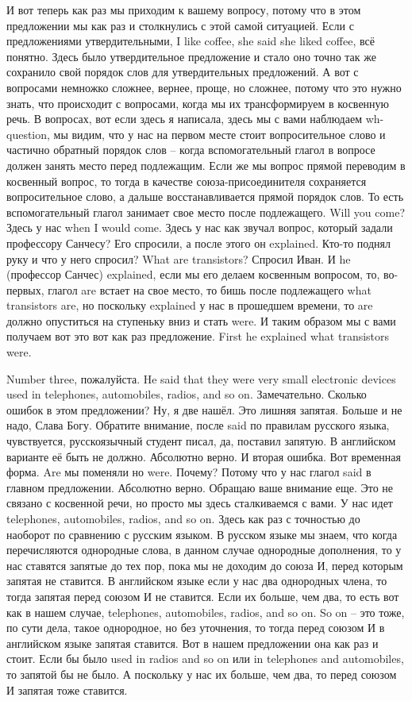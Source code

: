\documentclass[main.tex]{subfiles}
\begin{document}
И вот теперь как раз мы приходим к вашему вопросу, потому что в этом предложении мы как раз и столкнулись с этой самой ситуацией.
Если с предложениями утвердительными, I like coffee, she said she liked coffee, всё понятно.
Здесь было утвердительное предложение и стало оно точно так же сохранило свой порядок слов для утвердительных предложений.
А вот с вопросами немножко сложнее, вернее, проще, но сложнее, потому что это нужно знать, что происходит с вопросами, когда мы их трансформируем в косвенную речь.
В вопросах, вот если здесь я написала, здесь мы с вами наблюдаем wh-question, мы видим, что у нас на первом месте стоит вопросительное слово и частично обратный порядок слов -- когда вспомогательный глагол в вопросе должен занять место перед подлежащим.
Если же мы вопрос прямой переводим в косвенный вопрос, то тогда в качестве союза-присоединителя сохраняется вопросительное слово, а дальше восстанавливается прямой порядок слов.
То есть вспомогательный глагол занимает свое место после подлежащего.
Will you come?
Здесь у нас when I would come.
Здесь у нас как звучал вопрос, который задали профессору Санчесу?
Его спросили, а после этого он explained.
Кто-то поднял руку и что у него спросил?
What are transistors?
Спросил Иван.
И he (профессор Санчес) explained, если мы его делаем косвенным вопросом, то, во-первых, глагол are встает на свое место, то бишь после подлежащего what transistors are, но поскольку explained у нас в прошедшем времени, то are должно опуститься на ступеньку вниз и стать were.
И таким образом мы с вами получаем вот это вот как раз предложение.
First he explained what transistors were.

Number three, пожалуйста.
He said that they were very small electronic devices used in telephones, automobiles, radios, and so on.
Замечательно.
Сколько ошибок в этом предложении?
Ну, я две нашёл.
Это лишняя запятая.
Больше и не надо, Слава Богу.
Обратите внимание, после said по правилам русского языка, чувствуется, русскоязычный студент писал, да, поставил запятую.
В английском варианте её быть не должно.
Абсолютно верно.
И вторая ошибка.
Вот временная форма.
Are мы поменяли но were.
Почему?
Потому что у нас глагол said в главном предложении.
Абсолютно верно.
Обращаю ваше внимание еще.
Это не связано с косвенной речи, но просто мы здесь сталкиваемся с вами.
У нас идет telephones, automobiles, radios, and so on.
Здесь как раз с точностью до наоборот по сравнению с русским языком.
В русском языке мы знаем, что когда перечисляются однородные слова, в данном случае однородные дополнения, то у нас ставятся запятые до тех пор, пока мы не доходим до союза И, перед которым запятая не ставится.
В английском языке если у нас два однородных члена, то тогда запятая перед союзом И не ставится.
Если их больше, чем два, то есть вот как в нашем случае, telephones, automobiles, radios, and so on.
So on -- это тоже, по сути дела, такое однородное, но без уточнения, то тогда перед союзом И в английском языке запятая ставится.
Вот в нашем предложении она как раз и стоит.
Если бы было used in radios and so on или in telephones and automobiles, то запятой бы не было.
А поскольку у нас их больше, чем два, то перед союзом И запятая тоже ставится.
\end{document}
